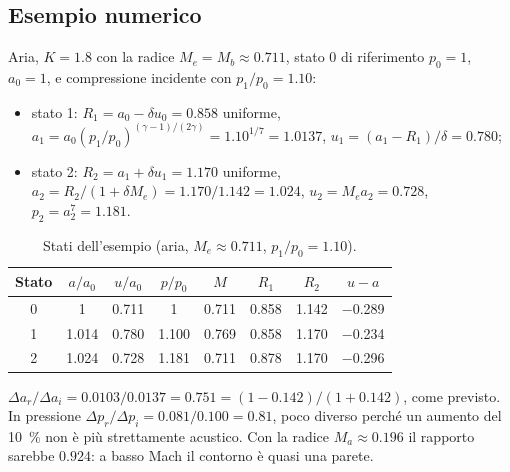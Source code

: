 \documentclass[11pt,a4paper]{article}
\newcommand{\Ru}{R_1}
\newcommand{\Rd}{R_2}
\newcommand{\Me}{M_e}
\begin{document}
\subsection{Esempio numerico}
Aria, $K=\num{1.8}$ con la radice $\Me=M_b\approx\num{0.711}$, stato 0 di riferimento $p_0=1$, $a_0=1$, e
compressione incidente con $p_1/p_0=\num{1.10}$:
\begin{itemize}
  \item stato 1: $\Ru=a_0-\delta u_0=\num{0.858}$ uniforme,
    $a_1=a_0(p_1/p_0)^{(\gamma-1)/(2\gamma)}=\num{1.10}^{1/7}=\num{1.0137}$,
    $u_1=(a_1-\Ru)/\delta=\num{0.780}$;
  \item stato 2: $\Rd=a_1+\delta u_1=\num{1.170}$ uniforme, $a_2=\Rd/(1+\delta\Me)=\num{1.170}/\num{1.142}=\num{1.024}$,
    $u_2=\Me a_2=\num{0.728}$, $p_2=a_2^{7}=\num{1.181}$.
\end{itemize}
\begin{table}[H]
  \centering
  \begin{tabular}{cccccccc}
    \toprule
    Stato & $a/a_0$ & $u/a_0$ & $p/p_0$ & $M$ & $\Ru$ & $\Rd$ & $u-a$ \\
    \midrule
    0 & \num{1} & \num{0.711} & \num{1} & \num{0.711} & \num{0.858} & \num{1.142} & \num{-0.289} \\
    1 & \num{1.014} & \num{0.780} & \num{1.100} & \num{0.769} & \num{0.858} & \num{1.170} & \num{-0.234} \\
    2 & \num{1.024} & \num{0.728} & \num{1.181} & \num{0.711} & \num{0.878} & \num{1.170} & \num{-0.296} \\
    \bottomrule
  \end{tabular}
  \caption{Stati dell'esempio (aria, $\Me\approx\num{0.711}$, $p_1/p_0=\num{1.10}$).}
\end{table}
$\Delta a_r/\Delta a_i=\num{0.0103}/\num{0.0137}=\num{0.751}=(1-\num{0.142})/(1+\num{0.142})$, come previsto.
In pressione $\Delta p_r/\Delta p_i=\num{0.081}/\num{0.100}=\num{0.81}$, poco diverso perché un aumento del
\SI{10}{\percent} non è più strettamente acustico. Con la radice $M_a\approx\num{0.196}$ il rapporto sarebbe
$\num{0.924}$: a basso Mach il contorno è quasi una parete.

\end{document}
